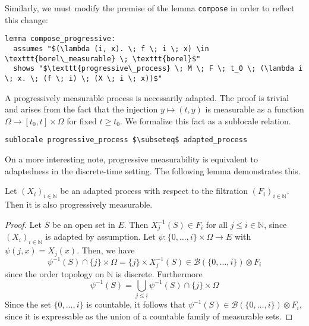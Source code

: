 Similarly, we must modify the premise of the lemma \texttt{compose} in order to reflect this change:

\begin{isalemma}
{\small
\begin{lstlisting}[style=isabelle]
lemma compose_progressive:
  assumes "$(\lambda (i, x). \; f \; i \; x) \in \texttt{borel\_measurable} \; \texttt{borel}$"
  shows "$\texttt{progressive\_process} \; M \; F \; t_0 \; (\lambda i \; x. \; (f \; i) \; (X \; i \; x))$"
  \end{lstlisting}
}
\end{isalemma}

A progressively measurable process is necessarily adapted. The proof is trivial and arises from the fact that the injection $y \mapsto (t, y)$ is measurable as a function $\Omega \rightarrow [t_0, t] \times \Omega$ for fixed $t \ge t_0$. We formalize this fact as a sublocale relation.

\begin{isalemma}
{\small
\begin{lstlisting}[style=isabelle]
sublocale progressive_process $\subseteq$ adapted_process 
\end{lstlisting}
}
\end{isalemma}

On a more interesting note, progressive measurability is equivalent to adaptedness in the discrete-time setting. The following lemma demonstrates this.

\begin{lemma}
	Let $(X_i)_{i \in \mathbb{N}}$ be an adapted process with respect to the filtration $(F_i)_{i \in \mathbb{N}}$. Then it is also progressively measurable.
\end{lemma}
\begin{proof}
	Let $S$ be an open set in $E$. Then $X_j^{-1}(S) \in F_i$ for all $j \le i \in \mathbb{N}$, since $(X_i)_{i \in \mathbb{N}}$ is adapted by assumption. Let $\psi : \{0,\dots,i\} \times \Omega \rightarrow E$ with $\psi(j,x) = X_j(x)$. Then, we have
	\[
		\psi^{-1}(S) \cap \{j\} \times \Omega = \{j\} \times X_j^{-1}(S) \in \mathcal{B}(\{0,\dots,i\}) \otimes F_i
	\]
	since the order topology on $\mathbb{N}$ is discrete. Furthermore
	\[
		\psi^{-1}(S) = \bigcup_{j \le i} \psi^{-1}(S) \cap \{j\} \times \Omega 
	\]
	Since the set $\{0,\dots,i\}$ is countable, it follows that $\psi^{-1}(S) \in \mathcal{B}(\{0,\dots,i\}) \otimes F_i$, since it is expressable as the union of a countable family of measurable sets.
\end{proof}

